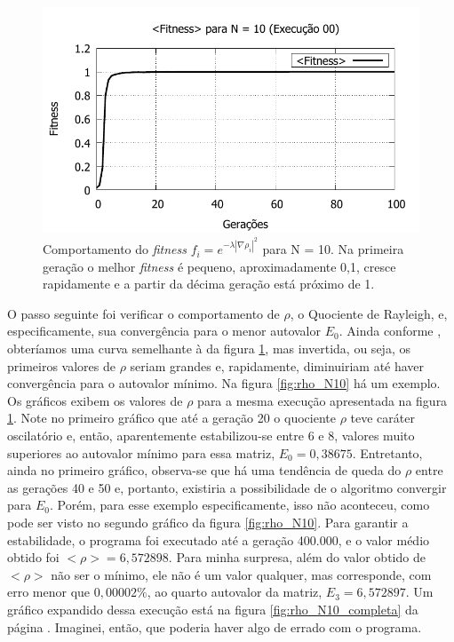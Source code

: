 	\begin{figure}[htbp]
		\centering
			\includegraphics{figs/resultados/fitnessGrad/N10_00_fitness.pdf}
			\caption{Comportamento do \textsl{fitness} $f_i = e^{-\lambda |\nabla \rho_i|^2}$ para N = 10. Na primeira geração o melhor \textit{fitness} é pequeno, aproximadamente 0,1, cresce rapidamente e a partir da décima geração está próximo de 1.}
		\label{fig:compFitnessTipo1N10}
	\end{figure}
	
	O passo seguinte foi verificar o comportamento de $\rho$, o Quociente de Rayleigh, e, especificamente, sua convergência para o menor autovalor $E_0$. Ainda conforme \cite{metodo2004}, obteríamos uma curva semelhante à da figura \ref{fig:compFitnessTipo1N10}, mas invertida, ou seja, os primeiros valores de $\rho$ seriam grandes e, rapidamente, diminuiriam até haver convergência para o autovalor mínimo. Na figura \ref{fig:rho_N10} há um exemplo.	Os gráficos exibem os valores de $\rho$ para a mesma execução apresentada na figura \ref{fig:compFitnessTipo1N10}. Note no primeiro gráfico que até a geração 20 o quociente $\rho$ teve caráter oscilatório e, então, aparentemente estabilizou-se entre 6 e 8, valores muito superiores ao autovalor mínimo para essa matriz, $E_0 = 0,38675$. Entretanto, ainda no primeiro gráfico, observa-se que há uma tendência de queda do $\rho$ entre as gerações 40 e 50 e, portanto, existiria a possibilidade de o algoritmo convergir para $E_0$. Porém, para esse exemplo especificamente, isso não aconteceu, como pode ser visto no segundo gráfico da figura \ref{fig:rho_N10}. Para garantir a estabilidade, o programa foi executado até a geração 400.000, e o valor médio obtido foi $<\rho> = 6,572898$. Para minha surpresa, além do valor obtido de $<\rho>$ não ser o mínimo, ele não é um valor qualquer, mas corresponde, com erro menor que $0,00002\%$, ao quarto autovalor da matriz, $E_3 = 6,572897$. Um gráfico expandido dessa execução está na figura \ref{fig:rho_N10_completa} da página \pageref{fig:rho_N10_completa}. Imaginei, então, que poderia haver algo de errado com o programa. 
	
